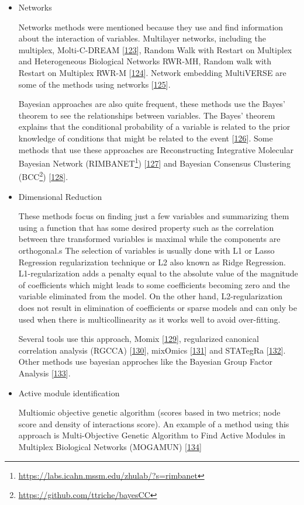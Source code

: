 \documentclass[
  12pt,
  a4paper,
  twoside,
  openright]{book}
\DeclareRobustCommand{\href}[2]{#2\footnote{\url{#1}}}
\begin{document}
\begin{itemize}
\item
  Networks

  Networks methods were mentioned because they use and find information about the interaction of variables.
  Multilayer networks, including the multiplex, Molti-C-DREAM {[}\protect\hyperlink{ref-didier2018}{123}{]}, Random Walk with Restart on Multiplex and Heterogeneous Biological Networks RWR-MH, Random walk with Restart on Multiplex RWR-M {[}\protect\hyperlink{ref-valdeolivas2019}{124}{]}.
  Network embedding MultiVERSE are some of the methods using networks {[}\protect\hyperlink{ref-pio-lopez2021}{125}{]}.

  Bayesian approaches are also quite frequent, these methods use the Bayes' theorem to see the relationships between variables.
  The Bayes' theorem explains that the conditional probability of a variable is related to the prior knowledge of conditions that might be related to the event {[}\protect\hyperlink{ref-bayes1763}{126}{]}.
  Some methods that use these approaches are Reconstructing Integrative Molecular Bayesian Network (\href{https://labs.icahn.mssm.edu/zhulab/?s=rimbanet}{RIMBANET}) {[}\protect\hyperlink{ref-zhu2012}{127}{]} and Bayesian Consensus Clustering (\href{https://github.com/ttriche/bayesCC}{BCC}) {[}\protect\hyperlink{ref-lock2013}{128}{]}.
\item
  Dimensional Reduction

  These methods focus on finding just a few variables and summarizing them using a function that has some desired property such as the correlation between thre transformed variables is maximal while the components are orthogonal.s The selection of variables is usually done with L1 or Lasso Regression regularization technique or L2 also known as Ridge Regression.
  L1-regularization adds a penalty equal to the absolute value of the magnitude of coefficients which might leads to some coefficients becoming zero and the variable eliminated from the model.
  On the other hand, L2-regularization does not result in elimination of coefficients or sparse models and can only be used when there is multicollinearity as it works well to avoid over-fitting.

  Several tools use this approach, Momix {[}\protect\hyperlink{ref-cantini2021}{129}{]}, regularized canonical correlation analysis (RGCCA) {[}\protect\hyperlink{ref-tenenhaus2017}{130}{]}, mixOmics {[}\protect\hyperlink{ref-rohart2017}{131}{]} and STATegRa {[}\protect\hyperlink{ref-gomez-cabrero2019}{132}{]}.
  Other methods use bayesian approches like the Bayesian Group Factor Analysis {[}\protect\hyperlink{ref-virtanen2012}{133}{]}.
\item
  Active module identification

  Multiomic objective genetic algorithm (scores based in two metrics; node score and density of interactions score).
  An example of a method using this approach is Multi-Objective Genetic Algorithm to Find Active Modules in Multiplex Biological Networks (MOGAMUN) {[}\protect\hyperlink{ref-novoa-del-toro2020}{134}{]}
\end{itemize}
\end{document}
